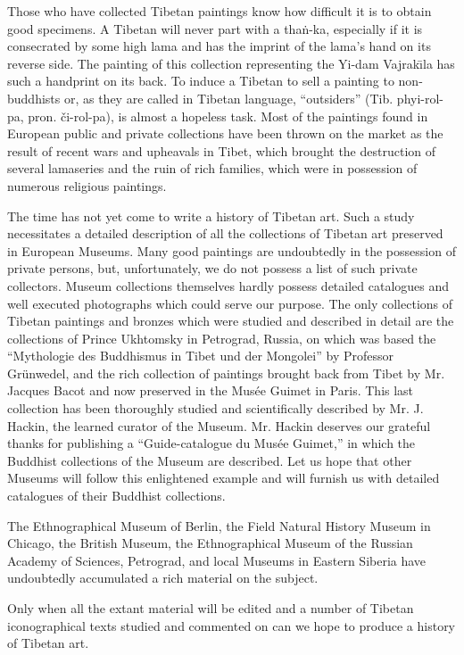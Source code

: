 \documentclass[a4paper, 12pt, oneside]{article}
\begin{document}
Those who have collected Tibetan paintings know how difficult it is to obtain good specimens. A Tibetan will never part with a tha\.{n}-ka, especially if it is consecrated by some high lama and has the imprint of the lama's hand on its reverse side. The painting of this collection representing the Yi-dam Vajrak\={\i}la has such a handprint on its back. To induce a Tibetan to sell a painting to non-buddhists or, as they are called in Tibetan language, ``outsiders'' (Tib. phyi-rol-pa, pron. či-rol-pa), is almost a hopeless task. Most of the paintings found in European public and private collections have been thrown on the market as the result of recent wars and upheavals in Tibet, which brought the destruction of several lamaseries and the ruin of rich families, which were in possession of numerous religious paintings.

The time has not yet come to write a history of Tibetan art. Such a study necessitates a detailed description of all the collections of Tibetan art preserved in European Museums. Many good paintings are undoubtedly in the possession of private persons, but, unfortunately, we do not possess a list of such private collectors. Museum collections themselves hardly possess detailed catalogues and well executed photographs which could serve our purpose. The only collections of Tibetan paintings and bronzes which were studied and described in detail are the collections of Prince Ukhtomsky in Petrograd, Russia, on which was based the ``Mythologie des Buddhismus in Tibet und der Mongolei'' by Professor Grünwedel, and the rich collection of paintings brought back from Tibet by Mr. Jacques Bacot and now preserved in the Musée Guimet in Paris. This last collection has been thoroughly studied and scientifically described by Mr. J. Hackin, the learned curator of the Museum. Mr. Hackin deserves our grateful thanks for publishing a ``Guide-catalogue du Musée Guimet,'' in which the Buddhist collections of the Museum are described. Let us hope that other Museums will follow this enlightened example and will furnish us with detailed catalogues of their Buddhist collections.

The Ethnographical Museum of Berlin, the Field Natural History Museum in Chicago, the British Museum, the Ethnographical Museum of the Russian Academy of Sciences, Petrograd, and local Museums in Eastern Siberia have undoubtedly accumulated a rich material on the subject.

Only when all the extant material will be edited and a number of Tibetan iconographical texts studied and commented on can we hope to produce a history of Tibetan art.
\end{document}
